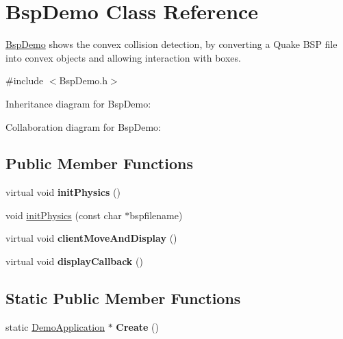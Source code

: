 \hypertarget{class_bsp_demo}{\section{Bsp\+Demo Class Reference}
\label{class_bsp_demo}
}


\hyperlink{class_bsp_demo}{Bsp\+Demo} shows the convex collision detection, by converting a Quake B\+S\+P file into convex objects and allowing interaction with boxes.  




{\ttfamily \#include $<$Bsp\+Demo.\+h$>$}



Inheritance diagram for Bsp\+Demo\+:


Collaboration diagram for Bsp\+Demo\+:
\subsection*{Public Member Functions}
\begin{DoxyCompactItemize}
\item 
\hypertarget{class_bsp_demo_a748878ae528f239dfebf2b80147e6687}{virtual void {\bfseries init\+Physics} ()}\label{class_bsp_demo_a748878ae528f239dfebf2b80147e6687}

\item 
void \hyperlink{class_bsp_demo_a01ac3008feb83d093231cf74bf784bd4}{init\+Physics} (const char $\ast$bspfilename)
\item 
\hypertarget{class_bsp_demo_ae27a6a569e9b44717c8becc214379fb6}{virtual void {\bfseries client\+Move\+And\+Display} ()}\label{class_bsp_demo_ae27a6a569e9b44717c8becc214379fb6}

\item 
\hypertarget{class_bsp_demo_a44f54abd58557e68d3b2efd8f72f405d}{virtual void {\bfseries display\+Callback} ()}\label{class_bsp_demo_a44f54abd58557e68d3b2efd8f72f405d}

\end{DoxyCompactItemize}
\subsection*{Static Public Member Functions}
\begin{DoxyCompactItemize}
\item 
\hypertarget{class_bsp_demo_a1485d9eb1a82ef6c82c96d57fcd85a1c}{static \hyperlink{class_demo_application}{Demo\+Application} $\ast$ {\bfseries Create} ()}\label{class_bsp_demo_a1485d9eb1a82ef6c82c96d57fcd85a1c}

\end{DoxyCompactItemize}
